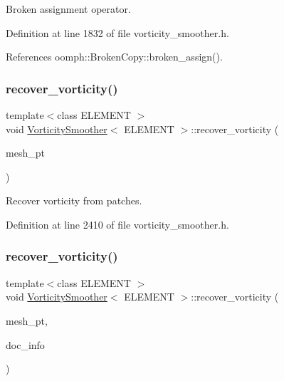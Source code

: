 Broken assignment operator. 



Definition at line 1832 of file vorticity\+\_\+smoother.\+h.



References oomph\+::\+Broken\+Copy\+::broken\+\_\+assign().

\mbox{\label{classVorticitySmoother_a17be1c387c77c626bbc596dd5817afe4}} 
\subsubsection{\texorpdfstring{recover\+\_\+vorticity()}{recover\_vorticity()}\hspace{0.1cm}{\footnotesize\ttfamily [1/2]}}
{\footnotesize\ttfamily template$<$class E\+L\+E\+M\+E\+NT $>$ \\
void \hyperlink{classVorticitySmoother}{Vorticity\+Smoother}$<$ E\+L\+E\+M\+E\+NT $>$\+::recover\+\_\+vorticity (\begin{DoxyParamCaption}\item[{Mesh $\ast$}]{mesh\+\_\+pt }\end{DoxyParamCaption})\hspace{0.3cm}{\ttfamily [inline]}}



Recover vorticity from patches. 



Definition at line 2410 of file vorticity\+\_\+smoother.\+h.

\mbox{\label{classVorticitySmoother_a8d51ff41709093afa9ff77b35b281cc7}} 
\subsubsection{\texorpdfstring{recover\+\_\+vorticity()}{recover\_vorticity()}\hspace{0.1cm}{\footnotesize\ttfamily [2/2]}}
{\footnotesize\ttfamily template$<$class E\+L\+E\+M\+E\+NT $>$ \\
void \hyperlink{classVorticitySmoother}{Vorticity\+Smoother}$<$ E\+L\+E\+M\+E\+NT $>$\+::recover\+\_\+vorticity (\begin{DoxyParamCaption}\item[{Mesh $\ast$}]{mesh\+\_\+pt,  }\item[{Doc\+Info \&}]{doc\+\_\+info }\end{DoxyParamCaption})\hspace{0.3cm}{\ttfamily [inline]}}



